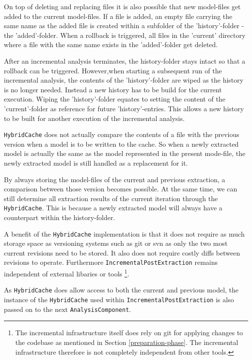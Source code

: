 \documentclass[a4paper]{article}
\begin{document}
 On top of deleting and replacing files it is also possible that new model-files get added to the current model-files. If a file is added, an empty file carrying the same name as the added file is created within a subfolder of the 'history'-folder - the 'added'-folder. When a rollback is triggered, all files in the 'current' directory where a file with the same name exists in the 'added'-folder get deleted.
 
After an incremental analysis terminates, the history-folder stays intact so that a rollback can be triggered. 
However,when starting a subsequent run of the incremental analysis, the contents of the 'history'-folder are wiped as the history is no longer needed. Instead a new history has to be build for the current execution. Wiping the 'history'-folder equates to setting the content of the 'current'-folder as reference for future 'history'-entries. This allows a new history to be built for another execution of the incremental analysis.
  
 \texttt{Hybrid\-Cache} does not actually compare the contents of a file with the previous version when a model is to be written to the cache. So when a newly extracted model is actually the same as the model represented in the present mode-file, the newly extracted model is still handled as a replacement for it. 
  
 By always storing the model-files of the current and previous extraction, a comparison between those version becomes possible. At the same time, we can still determine all extraction results of the current iteration through the \texttt{Hybrid\-Cache}. This is because a newly extracted model will always have a counterpart within the history-folder.
   
 A benefit of the \texttt{Hybrid\-Cache} implementation is that it does not require as much storage space as versioning systems such as git or svn as only the two most current revisions need to be stored. It also does not require costly diffs between revisions to operate. Furthermore \texttt{Incremental\-Post\-Extraction} remains independent of external libaries or tools \footnote{The incremental infrastructure itself does rely on git for applying changes to the codebase as mentioned in Section \ref{preparation-phase}. The incremental infrastructure therefore is not completely independent from other tools.}.
 
As \texttt{Hybrid\-Cache} does allow access to both the current and previous model, the instance of the \texttt{Hybrid\-Cache} used within \texttt{Incremental\-Post\-Extraction} is also passed on to the next \texttt{Analysis\-Component}. 
  
\end{document}
